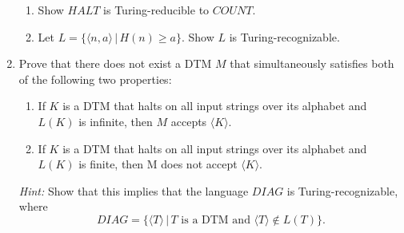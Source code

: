 \documentclass[11pt]{article}
\begin{document}
\begin{enumerate}
\begin{enumerate}
\item Show $HALT$ is Turing-reducible to $COUNT$.

\item Let $L = \{\langle n, a \rangle \, | \, H(n) \geq a \}$. Show $L$ is Turing-recognizable.
\end{enumerate}

\item Prove that there does not exist a DTM $M$ that simultaneously satisfies both of the following two properties:
\begin{enumerate}
\item If $K$ is a DTM that halts on all input strings over its alphabet and $L(K)$ is infinite, then $M$ accepts $\langle K \rangle$.
\item If $K$ is a DTM that halts on all input strings over its alphabet and $L(K)$ is finite, then M does not accept $\langle K \rangle$.
\end{enumerate}
\emph{Hint:} Show that this implies that the language $ DIAG $ is Turing-recognizable, where
\begin{equation*}
DIAG = \{\langle T \rangle \, | \, T \textrm{ is a DTM and } \langle T \rangle \notin L(T) \}.
\end{equation*}

\end{enumerate}
\end{document}
